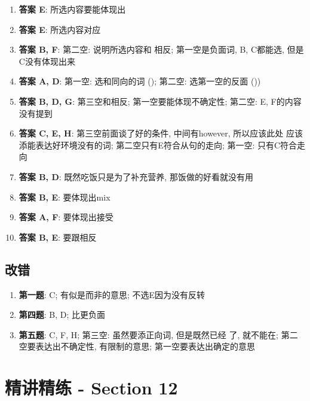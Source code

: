   \begin{enumerate}
    \item \textbf{答案 E}: 所选内容要能体现出
    \item \textbf{答案 E}: 所选内容对应
    \item \textbf{答案 B, F}: 第二空: 说明所选内容和
    相反; 第一空是负面词, B, C都能选, 但是C没有体现出来
    \item \textbf{答案 A, D}: 第一空: 选和同向的词
    (); 第二空: 选第一空的反面 ())
    \item \textbf{答案 B, D, G}: 第三空和相反;
    第一空要能体现不确定性; 第二空: E, F的内容没有提到
    \item \textbf{答案 C, E, H}: 第三空前面谈了好的条件, 中间有however, 所以应该此处
    应该添能表达好环境没有的词; 第二空只有E符合从句的走向; 第一空: 只有C符合走向
    \item \textbf{答案 B, D}: 既然吃饭只是为了补充营养, 那饭做的好看就没有用
    \item \textbf{答案 B, E}: 要体现出mix
    \item \textbf{答案 A, F}: 要体现出接受
    \item \textbf{答案 B, E}: 要跟相反
  \end{enumerate}

  \subsection{改错}

    \begin{enumerate}
      \item \textbf{第一题}: C; 有似是而非的意思; 不选E因为没有反转
      \item \textbf{第四题}: B, D; 比更负面
      \item \textbf{第五题}: C, F, H; 第三空: 虽然要添正向词, 但是既然已经
      了, 就不能在; 第二空要表达出不确定性,
      有限制的意思; 第一空要表达出确定的意思
    \end{enumerate}

\section{精讲精练 - Section 12}

